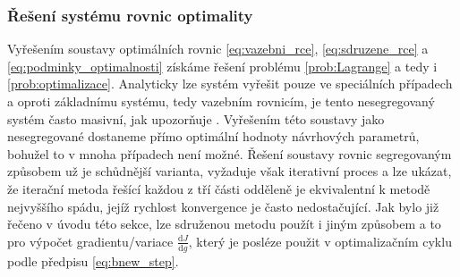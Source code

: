 \subsubsection{Řešení systému rovnic optimality}
Vyřešením soustavy optimálních rovnic \ref{eq:vazebni_rce}, \ref{eq:sdruzene_rce} a \ref{eq:podminky_optimalnosti} získáme řešení problému \ref{prob:Lagrange} a tedy i \ref{prob:optimalizace}. Analyticky lze systém vyřešit pouze ve speciálních případech a oproti základnímu systému, tedy vazebním rovnicím, je tento nesegregovaný systém často masivní, jak upozorňuje \cite{karman1997inverse}. Vyřešením této soustavy jako nesegregované dostaneme přímo optimální hodnoty návrhových parametrů, bohužel to v mnoha případech není možné. Řešení soustavy rovnic segregovaným způsobem už je schůdnější varianta, vyžaduje však iterativní proces a lze ukázat, že iterační metoda řešící každou z tří části odděleně je ekvivalentní k metodě nejvyššího spádu\cite{karman1997inverse}, jejíž rychlost konvergence je často nedostačující. Jak bylo již řečeno v úvodu této sekce, lze sdruženou metodu použít i jiným způsobem a to pro výpočet gradientu/variace $ \frac{\mathrm{d} J}{\mathrm{d} g} $, který je posléze použit v optimalizačním cyklu podle předpisu \ref{eq:bnew_step}.

